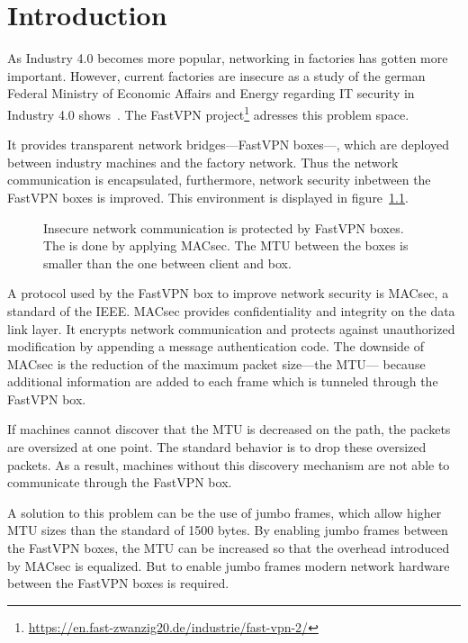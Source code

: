 \chapter{Introduction}
\label{ch:intro}
As Industry 4.0 becomes more popular, networking in factories has gotten more important.
However, current factories are insecure as a study of the german Federal Ministry of Economic Affairs and Energy regarding IT security in Industry 4.0 shows~\cite{studiebmwi}.
The FastVPN project\footnote{\url{https://en.fast-zwanzig20.de/industrie/fast-vpn-2/}} adresses this problem space.

It provides transparent network bridges---FastVPN boxes---, which are deployed between industry machines and the factory network.
Thus the network communication is encapsulated, furthermore, network security inbetween the FastVPN boxes is improved.
This environment is displayed in figure~\ref{fig:environment}.

\begin{figure}[!h]
  \centering
  \def\svgwidth{0.8\columnwidth}
  
  \caption[FastVPN Setup Example]{Insecure network communication is protected by FastVPN boxes. The is done by applying MACsec. The \acrlong{MTU} between the boxes is smaller than the one between client and box.}
  \label{fig:environment}
\end{figure}

A protocol used by the FastVPN box to improve network security is \gls{MACsec}, a standard of the \gls{IEEE}.
\gls{MACsec} provides confidentiality and integrity on the data link layer.
It encrypts network communication and protects against unauthorized modification by appending a message authentication code.
The downside of \gls{MACsec} is the reduction of the maximum packet size---the \gls{MTU}--- because additional information are added to each frame which is tunneled through the FastVPN box.

If machines cannot discover that the \gls{MTU} is decreased on the path, the packets are oversized at one point.
The standard behavior is to drop these oversized packets.
As a result, machines without this discovery mechanism are not able to communicate through the FastVPN box.

A solution to this problem can be the use of jumbo frames, which allow higher \gls{MTU} sizes than the standard of 1500 bytes.
By enabling jumbo frames between the FastVPN boxes, the \gls{MTU} can be increased so that the overhead introduced by \gls{MACsec} is equalized.
But to enable jumbo frames modern network hardware between the FastVPN boxes is required.

